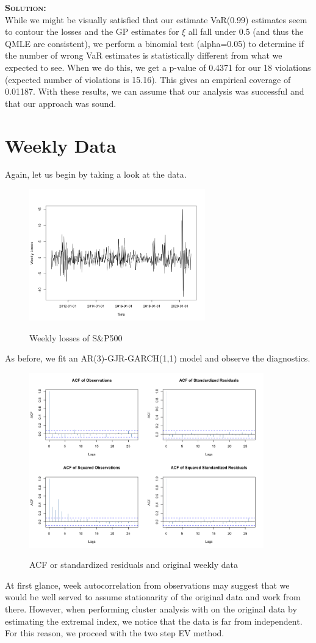 \documentclass[12pt,oneside]{article}
\newenvironment{solution}
    {\textbf{\textsc{Solution:}}\\}
    {\newpage}
\begin{document}
\begin{solution}
While we might be visually satisfied that our estimate VaR(0.99) estimates seem to contour the losses and the GP estimates for $\xi$ all fall under 0.5 (and thus the QMLE are consistent), we perform a binomial test (alpha=0.05) to determine if the number of wrong VaR estimates is statistically different from what we expected to see. When we do this, we get a p-value of 0.4371 for our 18 violations (expected number of violations is 15.16). This gives an empirical coverage of 0.01187. With these results, we can assume that our analysis was successful and that our approach was sound.

\section*{Weekly Data}
Again, let us begin by taking a look at the data.
\begin{figure}[H]
\begin{center}
{\includegraphics[width=3in]{Assignments/a4/week-data.png}}
\caption{Weekly losses of S\&P500 }
\end{center}
\end{figure}
As before, we fit an AR(3)-GJR-GARCH(1,1) model and observe the diagnostics. 
\begin{figure}[H]
\begin{center}
{\includegraphics[width=4in]{Assignments/a4/week-acfs.png}}
\caption{ACF or standardized residuals and original weekly data }
\end{center}
\end{figure}
At first glance, week autocorrelation from observations may suggest that we would be well served to assume stationarity of the original data and work from there. However, when performing cluster analysis with on the original data by estimating the extremal index, we notice that the data is far from independent. For this reason, we proceed with the two step EV method.


\end{solution}
\end{document}
